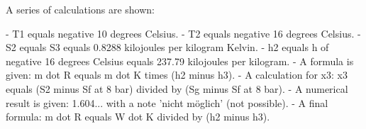 A series of calculations are shown:

- T1 equals negative 10 degrees Celsius.
- T2 equals negative 16 degrees Celsius.
- S2 equals S3 equals 0.8288 kilojoules per kilogram Kelvin.
- h2 equals h of negative 16 degrees Celsius equals 237.79 kilojoules per kilogram.
- A formula is given: m dot R equals m dot K times (h2 minus h3).
- A calculation for x3: x3 equals (S2 minus Sf at 8 bar) divided by (Sg minus Sf at 8 bar).
- A numerical result is given: 1.604... with a note 'nicht möglich' (not possible).
- A final formula: m dot R equals W dot K divided by (h2 minus h3).